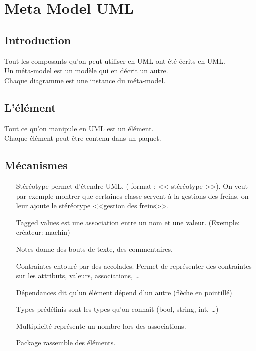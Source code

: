 \section{Meta Model UML}



\subsection{Introduction}
Tout les composants qu’on peut utiliser en UML ont été écrits en UML.
\\Un méta-model est un modèle qui en décrit un autre.
\\Chaque diagramme est une instance du méta-model.



\subsection{L'élément}
Tout ce qu’on manipule en UML est un élément.
\\Chaque élément peut être contenu dans un paquet.



\subsection{Mécanismes}
\begin{itemize}
	\item [Stéréotype] permet d’étendre UML. ( format : << stéréotype >>). On veut par exemple montrer que certaines classe servent à la gestions des freins, on leur ajoute le stéréotype <<gestion des freins>>.

	\item [Tagged values] est une association entre un nom et une valeur. (Exemple: créateur: machin)
    
	\item [Notes] donne des bouts de texte, des commentaires.

	\item [Contraintes] entouré par des accolades. Permet de représenter des contraintes sur les attributs, valeurs, associations, …

	\item [Dépendances] dit qu’un élément dépend d’un autre (flèche en pointillé)

	\item [Types prédéfinis] sont les types qu’on connaît (bool, string, int, …)

	\item [Multiplicité] représente un nombre lors des associations.

	\item [Package] rassemble des éléments.

\end{itemize}



